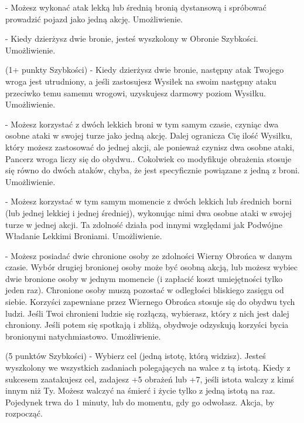 { - Możesz wykonać atak lekką lub średnią bronią dystansową i spróbować prowadzić pojazd jako jedną akcję. Umożliwienie.

  - Kiedy dzierżysz dwie bronie, jesteś wyszkolony w Obronie Szybkości. Umożliwienie. 

 (1+ punkty Szybkości) - Kiedy dzierżysz dwie bronie, następny atak Twojego wroga jest utrudniony, a jeśli zastosujesz Wysiłek na swoim następny ataku przeciwko temu samemu wrogowi, uzyskujesz darmowy poziom Wysiłku. Umożliwienie.

 - Możesz korzystać z dwóch lekkich broni w tym samym czasie, czyniąc dwa osobne ataki w swojej turze jako jedną akcję. Dalej ogranicza Cię ilość Wysiłku, który możesz zastosować do jednej akcji, ale ponieważ czynisz dwa osobne ataki, Pancerz wroga liczy się do obydwu.. Cokolwiek co modyfikuje obrażenia stosuje się równo do dwóch ataków, chyba, że jest specyficznie powiązane z jedną z broni. Umożliwienie. 

 - Możesz korzystać w tym samym momencie z dwóch lekkich lub średnich borni (lub jednej lekkiej i jednej średniej), wykonując nimi dwa osobne ataki w swojej turze w jednej akcji. Ta zdolność działa pod innymi względami jak Podwójne Władanie Lekkimi Broniami. Umożliwienie.

 - Możesz posiadać dwie chronione osoby ze zdolności Wierny Obrońca w danym czasie. Wybór drugiej bronionej osoby może być osobną akcją, lub możesz wybiec dwie bronione osoby w jednym momencie (i zapłacić koszt umiejętności tylko jeden raz). Chronione osoby muszą pozostać w odległości bliskiego zasięgu od siebie. Korzyści zapewniane przez Wiernego Obrońca stosuje się do obydwu tych ludzi. Jeśli Twoi chronieni ludzie się rozłączą, wybierasz, który z nich jest dalej chroniony. Jeśli potem się spotkają i zbliżą, obydwoje odzyskują korzyści bycia bronionymi natychmiastowo. Umożliwienie. 

 (5 punktów Szybkości) - Wybierz cel (jedną istotę, którą widzisz). Jesteś wyszkolony we wszystkich zadaniach polegających na walce z tą istotą. Kiedy z sukcesem zaatakujesz cel, zadajesz +5 obrażeń lub +7, jeśli istota walczy z kimś innym niż Ty. Możesz walczyć na śmierć i życie tylko z jedną istotą na raz. Pojedynek trwa do 1 minuty, lub do momentu, gdy go odwołasz. Akcja, by rozpocząć. 

}
